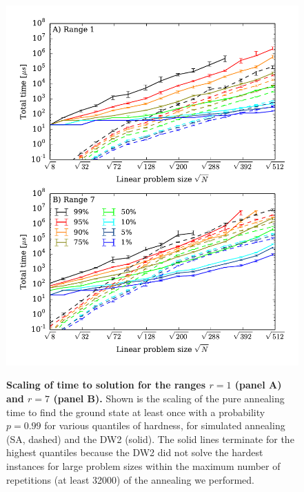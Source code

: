 \begin{figure}
\includegraphics[width=1\columnwidth]{chapters/Speedup/fig03.pdf}
\label{fig:scalingraw7}
\caption{{\bf Scaling of time to solution for the ranges $r=1$ (panel A) and $r=7$ (panel B).} Shown is the scaling of the pure annealing time to find the ground state at least once with a probability $p=0.99$ for various quantiles of hardness, for simulated annealing (SA, dashed) and the DW2 (solid).
The solid lines terminate for the highest quantiles because the DW2 did not solve the hardest instances for large problem sizes within the maximum number of repetitions (at least 32000) of the annealing we performed.
}
\label{fig:scalingraw}
\end{figure}
